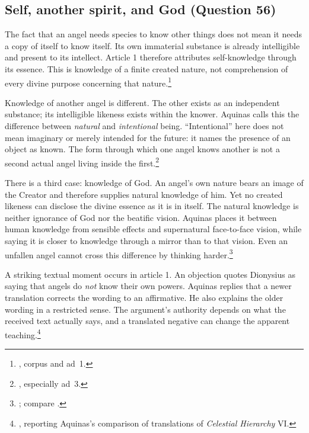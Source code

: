 
\subsection{Self, another spirit, and God (Question 56)}

The fact that an angel needs species to know other things does not mean it needs a copy of itself to know itself. Its own immaterial substance is already intelligible and present to its intellect. Article 1 therefore attributes self-knowledge through its essence. This is knowledge of a finite created nature, not comprehension of every divine purpose concerning that nature.\footnote{, corpus and ad~1.}

Knowledge of another angel is different. The other exists as an independent substance; its intelligible likeness exists within the knower. Aquinas calls this the difference between \emph{natural} and \emph{intentional} being. ``Intentional'' here does not mean imaginary or merely intended for the future: it names the presence of an object as known. The form through which one angel knows another is not a second actual angel living inside the first.\footnote{, especially ad~3.}

There is a third case: knowledge of God. An angel's own nature bears an image of the Creator and therefore supplies natural knowledge of him. Yet no created likeness can disclose the divine essence as it is in itself. The natural knowledge is neither ignorance of God nor the beatific vision. Aquinas places it between human knowledge from sensible effects and supernatural face-to-face vision, while saying it is closer to knowledge through a mirror than to that vision. Even an unfallen angel cannot cross this difference by thinking harder.\footnote{; compare .}

A striking textual moment occurs in article 1. An objection quotes Dionysius as saying that angels do \emph{not} know their own powers. Aquinas replies that a newer translation corrects the wording to an affirmative. He also explains the older wording in a restricted sense. The argument's authority depends on what the received text actually says, and a translated negative can change the apparent teaching.\footnote{, reporting Aquinas's comparison of translations of \emph{Celestial Hierarchy} VI.}

